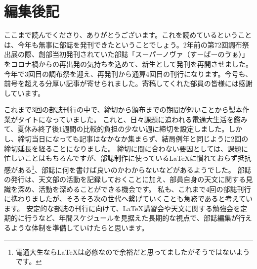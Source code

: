 \documentclass[../super_nova_20yy]{subfiles}
\begin{document}
\chapter{編集後記}
\vspace{2\zw}

ここまで読んでくださり、ありがとうございます。これを読めているということは、今年も無事に部誌を発刊できたということでしょう。2年前の第72回調布祭出展の際、創部当初発刊されていた部誌「スーパーノヴァ（すーぱーのゔぁ）」をコロナ禍からの再出発の気持ちを込めて、新生\SuperNova として発刊を再開させました。今年で3回目の調布祭を迎え、再発刊から通算4回目の刊行になります。今号も、前号を超える分厚い記事が寄せられました。寄稿してくれた部員の皆様には感謝しています。

これまで3回の部誌刊行の中で、締切から頒布までの期間が短いことから製本作業がタイトになっていました。
これと、日々課題に追われる電通大生活を鑑みて、夏休み終了後1週間の比較的負担の少ない週に締切を設定しました。しかし、締切当日になっても記事はなかなか集まらず、結局例年と同じように2回の締切延長を経ることになりました。
締切に間に合わない要因としては、課題に忙しいことはもちろんですが、部誌制作に使っている\LaTeX に慣れておらず抵抗感がある\footnote{電通大生なら\LaTeX は必修なので余裕だと思ってましたがそうではないようです。}、部誌に何を書けば良いのかわからないなどがあるようでした。
部誌の発行は、天文部の活動を記録しておくことに加え、部員自身の天文に関する見識を深め、活動を深めることができる機会です。
私も、これまで4回の部誌刊行に携わりましたが、そろそろ次の世代へ繋げていくことも急務であると考えています。
安定的な部誌の刊行に向けて、\LaTeX 講習会や天文に関する勉強会を定期的に行うなど、年間スケジュールを見据えた長期的な視点で、部誌編集が行えるような体制を準備していけたらと思います。


\end{document}
